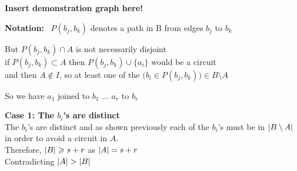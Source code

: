\documentclass{article}
\theoremstyle{plain}
\theoremstyle{definition}
\theoremstyle{remark}
\newcommand\Notation{%
  \textbf{Notation:}~%
}
\begin{document}
 \textbf{Insert demonstration graph here!}
 
 \vspace{2mm}
 
 \begin{minipage}{.2\textwidth}
 \end{minipage}
\hspace{4cm} \begin{minipage}{.2\textwidth}
 \end{minipage}
 
 \vspace{2mm}
 
 \noindent\Notation $ P ( b_j, b_k ) $ denotes a path in B from edges $ b_j $ to $ b_k $
 
 \vspace{2mm}
 
\noindent But $ P(b_j,b_k) \cap A $ is not necessarily disjoint\\
\noindent if $ P(b_j,b_k) \subset A  $ then $ P(b_j,b_k) \cup \{ a_i \} $  would be a circuit\\ and then $ A \notin I $, so at least one of the $ \big( b_i \in P(b_j,b_k) \big) \in B \setminus A $
 
 \vspace{4mm}
 
 \noindent So we have $ a_1 $ joined to $ b_1$ ... $ a_r $ to $ b_r $
 
 \vspace{2mm}
 
 \noindent\textbf{Case 1: The $ b_i$'s are distinct}\\
 The $ b_i$'s are distinct and as shown previously each of the $ b_i$'s must be in $ \abs{B \setminus A} $ in order to avoid a circuit in $ A $.\\ 
\noindent Therefore,
  $ \abs{B} \geqslant s + r $ as $ \abs{A}  = s + r $ \\Contradicting $ \abs{A}  >  \abs{B} $
 
\end{document}
